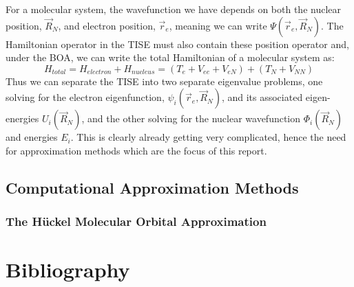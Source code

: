 \documentclass{article}
\begin{document}
For a molecular system, the wavefunction we have depends on both the nuclear position, $\vec{R}_N$, and electron position, $\vec{r}_e$, meaning we can write $\Psi(\vec{r}_e, \vec{R}_N)$. The Hamiltonian operator in the TISE must also contain these position operator and, under the BOA, we can write the total Hamiltonian of a molecular system as:
\begin{equation}
    H_{total} = H_{electron}+H_{nucleus} = (T_e + V_{ee} + V_{eN}) + (T_N + V_{NN})
    \label{eq3}
\end{equation}
Thus we can separate the TISE into two separate eigenvalue problems, one solving for the electron eigenfunction, $\psi_i(\vec{r}_e,\vec{R}_N)$, and its associated eigen-energies $U_i(\vec{R}_N)$, and the other solving for the nuclear wavefunction $\Phi_i(\vec{R}_N)$ and energies $E_i$. This is clearly already getting very complicated, hence the need for approximation methods which are the focus of this report.
\subsection{Computational Approximation Methods}
\subsubsection{The H\"uckel Molecular Orbital Approximation}




\pagebreak
\section{Bibliography}
\nocite{*} 


\end{document}
